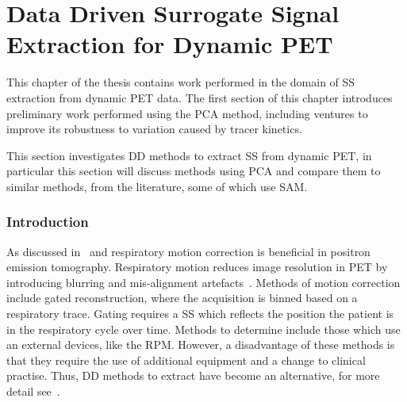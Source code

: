 \chapter{Data Driven Surrogate Signal Extraction for Dynamic PET} \label{sec:data_driven_surrogate_signal_extraction_results}
    \newpage
    
        This chapter of the thesis contains work performed in the domain of \gls{SS} extraction from dynamic \gls{PET} data. The first section of this chapter introduces preliminary work performed using the \gls{PCA} method, including ventures to improve its robustness to variation caused by tracer kinetics.
    
        This section investigates \gls{DD} methods to extract \gls{SS} from dynamic \gls{PET}, in particular this section will discuss methods using \gls{PCA} and compare them to similar methods, from the literature, some of which use \gls{SAM}.
        
        \subsection{Introduction} \label{sec:pca_data_driven_surrogate_signal_extraction_methods_for_dynamic_pet_introduction}
            As discussed in~ and  respiratory motion correction is beneficial in positron emission tomography. Respiratory motion reduces image resolution in \gls{PET} by introducing blurring and mis-alignment artefacts~. Methods of motion correction include gated reconstruction, where the acquisition is binned based on a respiratory trace. Gating requires a \gls{SS} which reflects the position the patient is in the respiratory cycle over time. Methods to determine  include those which use an external devices, like the \gls{RPM}. However, a disadvantage of these methods is that they require the use of additional equipment and a change to clinical practise. Thus, \gls{DD} methods to extract  have become an alternative, for more detail see~. 
            
